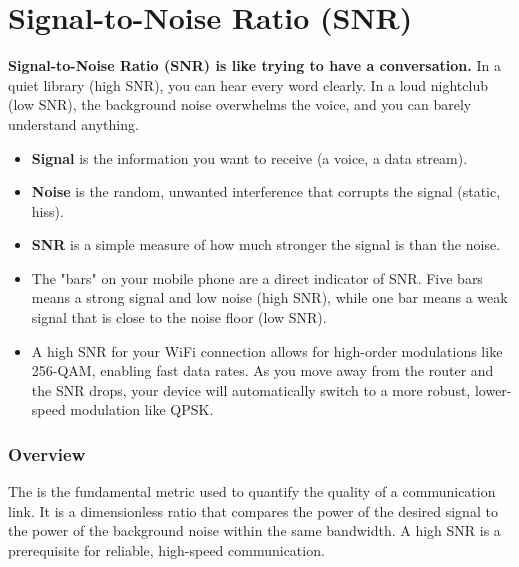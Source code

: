 
\chapter{Signal-to-Noise Ratio (SNR)}
\label{ch:snr}

\begin{nontechnical}
    \textbf{Signal-to-Noise Ratio (SNR) is like trying to have a conversation.} In a quiet library (high SNR), you can hear every word clearly. In a loud nightclub (low SNR), the background noise overwhelms the voice, and you can barely understand anything.

    \begin{itemize}
        \item \textbf{Signal} is the information you want to receive (a voice, a data stream).
        \item \textbf{Noise} is the random, unwanted interference that corrupts the signal (static, hiss).
        \item \textbf{SNR} is a simple measure of how much stronger the signal is than the noise.
    \end{itemize}

    \begin{itemize}
        \item The "bars" on your mobile phone are a direct indicator of SNR. Five bars means a strong signal and low noise (high SNR), while one bar means a weak signal that is close to the noise floor (low SNR).
        \item A high SNR for your WiFi connection allows for high-order modulations like 256-QAM, enabling fast data rates. As you move away from the router and the SNR drops, your device will automatically switch to a more robust, lower-speed modulation like QPSK.
    \end{itemize}
\end{nontechnical}


\subsection{Overview}

The  is the fundamental metric used to quantify the quality of a communication link. It is a dimensionless ratio that compares the power of the desired signal to the power of the background noise within the same bandwidth. A high SNR is a prerequisite for reliable, high-speed communication.

